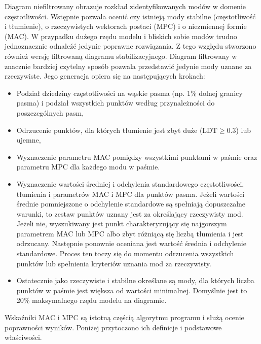 Diagram niefiltrowany obrazuje rozkład zidentyfikowanych modów w domenie częstotliwości. Wstępnie pozwala ocenić czy istnieją mody stabilne (częstotliwość i tłumienie), o rzeczywistych wektorach postaci (MPC) i o niezmiennej formie (MAC). W przypadku dużego rzędu modelu i bliskich sobie modów trudno jednoznacznie odnaleźć jedynie poprawne rozwiązania. Z tego względu stworzono również wersję filtrowaną diagramu stabilizacyjnego. Diagram filtrowany w znacznie bardziej czytelny sposób pozwala przedstawić jedynie mody uznane za rzeczywiste. Jego generacja opiera się na następujących krokach:
\begin{itemize}
	\item Podział dziedziny częstotliwości na wąskie pasma (np. 1\% dolnej granicy pasma) i podział wszystkich punktów według przynależności do poszczególnych pasm,
	\item Odrzucenie punktów, dla których tłumienie jest zbyt duże ($\text{LDT}\ge0.3$) lub ujemne,
	\item Wyznaczenie parametru MAC pomiędzy wszystkimi punktami w paśmie oraz parametru MPC dla każdego modu w paśmie.
	\item Wyznaczenie wartości średniej i odchylenia standardowego częstotliwości, tłumienia i parametrów MAC i MPC dla punktów pasma. Jeżeli wartości średnie pomniejszone o odchylenie standardowe są spełniają dopuszczalne warunki, to zestaw punktów uznany jest za określający rzeczywisty mod. Jeżeli nie, wyszukiwany jest punkt charakteryzujący się najgorszym parametrem MAC lub MPC albo zbyt różniącą się liczbą tłumienia i jest odrzucany. Następnie ponownie oceniana jest wartość średnia i odchylenie standardowe. Proces ten toczy się do momentu odrzucenia wszystkich punktów lub spełnienia kryteriów uznania mod za rzeczywisty.
	\item Ostatecznie jako rzeczywiste i stabilne określane są mody, dla których liczba punktów w paśmie jest większa od wartości minimalnej. Domyślnie jest to 20\% maksymalnego rzędu modelu na diagramie.
\end{itemize}
Wskaźniki MAC i MPC są istotną częścią algorytmu programu i służą ocenie poprawności wyników. Poniżej przytoczono ich definicje i podstawowe właściwości. 

